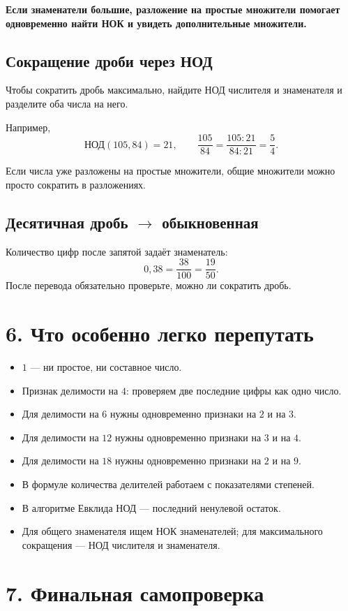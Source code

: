 \documentclass[a4paper,12pt]{article}
\newcommand{\nodtext}{\text{НОД}}
\newcommand{\important}[1]{%
  \par\vspace{0.25em}
  \noindent\colorbox{softgray}{\parbox{0.965\linewidth}{\textbf{#1}}}\par\vspace{0.25em}}
\begin{document}
\important{Если знаменатели большие, разложение на простые множители помогает одновременно найти НОК и увидеть дополнительные множители.}

\subsection{Сокращение дроби через НОД}
Чтобы сократить дробь максимально, найдите НОД числителя и знаменателя и разделите оба числа на него.

Например,
\[
\nodtext(105,84)=21,
\qquad
\frac{105}{84}=\frac{105:21}{84:21}=\boxed{\frac54}.
\]

Если числа уже разложены на простые множители, общие множители можно просто сократить в разложениях.

\subsection{Десятичная дробь $\rightarrow$ обыкновенная}
Количество цифр после запятой задаёт знаменатель:
\[
0{,}38=\frac{38}{100}=\boxed{\frac{19}{50}}.
\]
После перевода обязательно проверьте, можно ли сократить дробь.

\section{6. Что особенно легко перепутать}

\begin{itemize}[itemsep=0.12em,topsep=0.15em]
  \item $1$ --- ни простое, ни составное число.
  \item Признак делимости на $4$: проверяем две последние цифры как одно число.
  \item Для делимости на $6$ нужны одновременно признаки на $2$ и на $3$.
  \item Для делимости на $12$ нужны одновременно признаки на $3$ и на $4$.
  \item Для делимости на $18$ нужны одновременно признаки на $2$ и на $9$.
  \item В формуле количества делителей работаем с показателями степеней.
  \item В алгоритме Евклида НОД --- последний ненулевой остаток.
  \item Для общего знаменателя ищем НОК знаменателей; для максимального сокращения --- НОД числителя и знаменателя.
\end{itemize}

\section{7. Финальная самопроверка}
\end{document}
